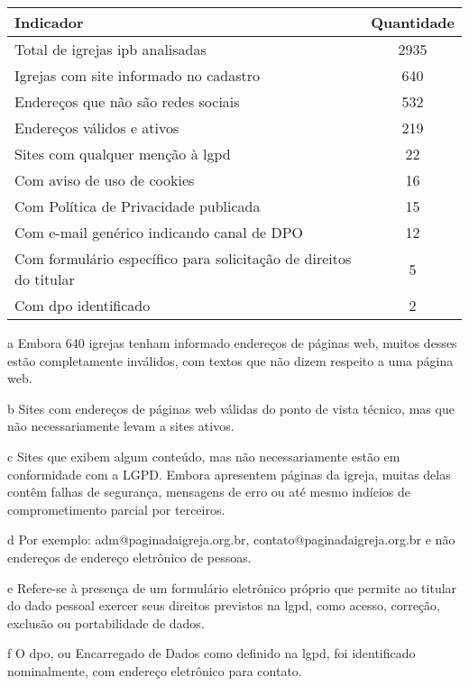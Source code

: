 \begin{table}[H]
\begin{threeparttable}
\begin{tabularx}{\textwidth}{>{\raggedright\arraybackslash}X c}
\toprule
\textbf{Indicador} & \textbf{Quantidade} \\
\midrule
Total de igrejas \gls{ipb} analisadas & 2935 \\
Igrejas com site informado no cadastro\tnote{a} & 640 \\
Endereços que não são redes sociais\tnote{b} & 532 \\
Endereços válidos e ativos\tnote{c} & 219 \\
Sites com qualquer menção à \gls{lgpd} & 22 \\
Com aviso de uso de cookies & 16 \\
Com Política de Privacidade publicada & 15 \\
Com e-mail genérico indicando canal de DPO\tnote{d} & 12 \\
Com formulário específico para solicitação de direitos do titular\tnote{e} & 5 \\
Com \gls{dpo} identificado\tnote{f} & 2 \\
\bottomrule
\end{tabularx}
\begin{tablenotes}
\footnotesize
\item[a] Embora 640 igrejas tenham informado endereços de páginas web, muitos desses estão completamente inválidos, com textos que não dizem respeito a uma página web.
\item[b] Sites com endereços de páginas web válidas do ponto de vista técnico, mas que não necessariamente levam a sites ativos.
\item[c] Sites que exibem algum conteúdo, mas não necessariamente estão em conformidade com a LGPD. Embora apresentem páginas da igreja, muitas delas contêm falhas de segurança, mensagens de erro ou até mesmo indícios de comprometimento parcial por terceiros.
\item[d] Por exemplo: adm@paginadaigreja.org.br, contato@paginadaigreja.org.br e não endereços de endereço eletrônico de pessoas.
\item[e] Refere-se à presença de um formulário eletrônico próprio que permite ao titular do dado pessoal exercer seus direitos previstos na \gls{lgpd}, como acesso, correção, exclusão ou portabilidade de dados.
\item[f] O \gls{dpo}, ou Encarregado de Dados como definido na \gls{lgpd}, foi identificado nominalmente, com endereço eletrônico para contato.
\end{tablenotes}
\end{threeparttable}
\end{table}
